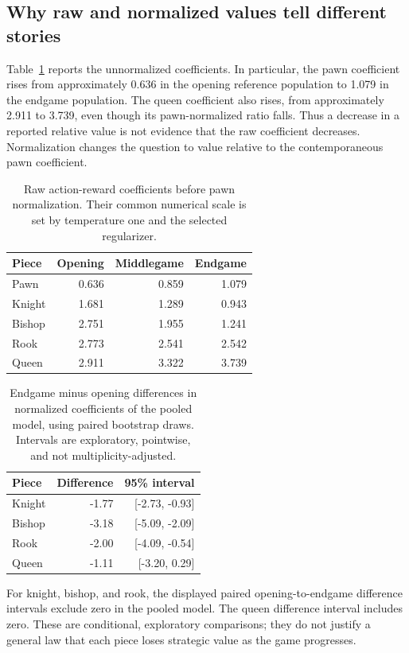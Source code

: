 \documentclass[11pt]{article}
\begin{document}
\subsection{Why raw and normalized values tell different stories}
Table~\ref{tab:raw} reports the unnormalized coefficients. In particular, the pawn coefficient rises from approximately 0.636 in the opening reference population to 1.079 in the endgame population. The queen coefficient also rises, from approximately 2.911 to 3.739, even though its pawn-normalized ratio falls. Thus a decrease in a reported relative value is not evidence that the raw coefficient decreases. Normalization changes the question to value relative to the contemporaneous pawn coefficient.
\begin{table}[htbp]\centering
\small
\caption{Raw action-reward coefficients before pawn normalization. Their common numerical scale is set by temperature one and the selected regularizer.}\label{tab:raw}
\begin{tabular}{lrrr}
\toprule
Piece & Opening & Middlegame & Endgame\\\midrule
Pawn & 0.636 & 0.859 & 1.079\\
Knight & 1.681 & 1.289 & 0.943\\
Bishop & 2.751 & 1.955 & 1.241\\
Rook & 2.773 & 2.541 & 2.542\\
Queen & 2.911 & 3.322 & 3.739\\
\bottomrule\end{tabular}\end{table}
\begin{table}[htbp]\centering
\small
\caption{Endgame minus opening differences in normalized coefficients of the pooled model, using paired bootstrap draws. Intervals are exploratory, pointwise, and not multiplicity-adjusted.}\label{tab:contrast}
\begin{tabular}{lrr}
\toprule
Piece & Difference & 95\% interval\\\midrule
Knight & -1.77 & [-2.73, -0.93]\\
Bishop & -3.18 & [-5.09, -2.09]\\
Rook & -2.00 & [-4.09, -0.54]\\
Queen & -1.11 & [-3.20, 0.29]\\
\bottomrule\end{tabular}\end{table}

For knight, bishop, and rook, the displayed paired opening-to-endgame difference intervals exclude zero in the pooled model. The queen difference interval includes zero. These are conditional, exploratory comparisons; they do not justify a general law that each piece loses strategic value as the game progresses.
\end{document}
